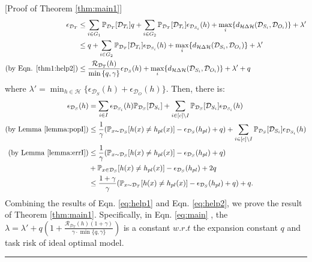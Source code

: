 \documentclass{article}
\newcommand{\BlackBox}{\rule{1.5ex}{1.5ex}}  \fi
\newenvironment{proof}{\par\noindent{\em Proof:\ }}{\hfill\BlackBox\\[.0mm]}
\begin{document}
\begin{proof}[Proof of Theorem \ref{thm:main1}]
\begin{equation}\label{eq:help1}
    \begin{aligned}
        \epsilon_{\mathcal{D}_T}&\leq \sum_{i \in G_1} \mathbb{P}_{\mathcal{D}_{T}}[\mathcal{D}_{T_i}] q + \sum_{i\in G_2} \mathbb{P}_{\mathcal{D}_{T}}[\mathcal{D}_{T_i}] \epsilon_{\mathcal{D}_{S_i}}(h) + \max_i \{d_{\mathcal{H}\Delta\mathcal{H}}(\mathcal{D}_{S_i},\mathcal{D}_{O_i})\} + {\lambda}' \\
        &\leq q + \sum_{i\in G_2} \mathbb{P}_{\mathcal{D}_{T}}[\mathcal{D}_{T_i}] \epsilon_{\mathcal{D}_{S_i}}(h) + \max_i \{d_{\mathcal{H}\Delta\mathcal{H}}(\mathcal{D}_{S_i},\mathcal{D}_{O_i})\} + {\lambda}' \\
         (\text{by Eqn. \ref{thm1:help2}})& \leq \frac{\mathcal{R}_{\mathcal{D}_T}(h)}{\min{\{q,\gamma\}}} \epsilon_{\mathcal{D}_{S}}(h)
         +\max_i \{d_{\mathcal{H}\Delta\mathcal{H}}(\mathcal{D}_{S_i},\mathcal{D}_{O_i})\} + {\lambda}'+q\\
    \end{aligned}
\end{equation}
where ${\lambda' = \min_{h\in \mathcal{H}}\{  \epsilon_{\mathcal{D}_{S}}(h)+ \epsilon_{\mathcal{D}_{O}}(h)}\}$.
Then, there is:
\begin{equation}\label{eq:help2}
\begin{aligned}
    \epsilon_{\mathcal{D}_{S}}(h)
    &=\sum_{i\in I}   \epsilon_{\mathcal{D}_{S_i}}(h)
    \mathbb{P}_{\mathcal{D}_{S}}[\mathcal{D}_{S_i}]
    +
    \sum_{i\in [c] \setminus I}  \mathbb{P}_{\mathcal{D}_{S}}[\mathcal{D}_{S_i}]\epsilon_{\mathcal{D}_{S_i}}(h) \\
    \text{(by Lemma \ref{lemma:popI})}
    &\leq \frac{1}{\gamma}(\mathbb{P}_{x\sim\mathcal{D}_{S}}[h(x)\neq h_{pl}(x)]-\epsilon_{\mathcal{D}_{S}}(h_{pl})+q) + \sum_{i\in [c] \setminus I}  \mathbb{P}_{\mathcal{D}_{S}}[\mathcal{D}_{S_i}]\epsilon_{\mathcal{D}_{S_i}}(h) \\
    \text{(by Lemma \ref{lemma:errI})}
    & \leq \frac{1}{\gamma}(\mathbb{P}_{x\sim\mathcal{D}_{S}}[h(x)\neq h_{pl}(x)]-\epsilon_{\mathcal{D}_{S}}(h_{pl})+q) \\
    &+ \mathbb{P}_{x\in\mathcal{D}_{S}}[h(x)\neq h_{pl}(x)]-\epsilon_{\mathcal{D}_{S}}(h_{pl})+2q\\
    & \leq \frac{1+\gamma}{\gamma}(\mathbb{P}_{x\sim\mathcal{D}_{T}}[h(x)\neq h_{pl}(x)]-\epsilon_{\mathcal{D}_{S}}(h_{pl})+q)+q.
\end{aligned}
\end{equation}
Combining the results of Eqn. \ref{eq:help1} and Eqn. \ref{eq:help2}, we prove the result of Theorem \ref{thm:main1}. Specifically, in Eqn. \ref{eq:main}
, the $\lambda = \lambda'+q(1+\frac{\mathcal{R}_{\mathcal{D}_T}(h)(1+\gamma)}{\gamma \cdot \min{\{q,\gamma\}}})$ is a constant $w.r.t$ the expansion constant $q$ and task risk of ideal optimal model.
\end{proof}
\end{document}
